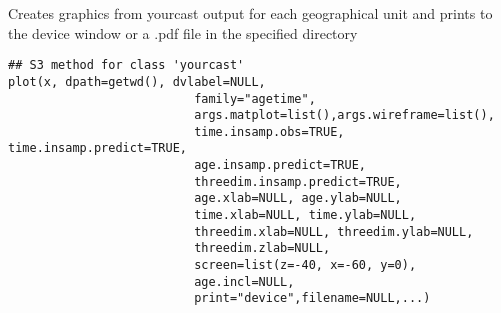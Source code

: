 %
\begin{Description}\relax
Creates graphics from yourcast output for each
geographical unit and prints to the device window or a .pdf file in
the specified directory
\end{Description}
%
\begin{Usage}
\begin{verbatim}
## S3 method for class 'yourcast'
plot(x, dpath=getwd(), dvlabel=NULL,
                          family="agetime",
                          args.matplot=list(),args.wireframe=list(),
                          time.insamp.obs=TRUE, time.insamp.predict=TRUE,
                          age.insamp.predict=TRUE,
                          threedim.insamp.predict=TRUE,
                          age.xlab=NULL, age.ylab=NULL,
                          time.xlab=NULL, time.ylab=NULL,
                          threedim.xlab=NULL, threedim.ylab=NULL,
                          threedim.zlab=NULL,
                          screen=list(z=-40, x=-60, y=0),
                          age.incl=NULL,
                          print="device",filename=NULL,...)
\end{verbatim}
\end{Usage}
%
